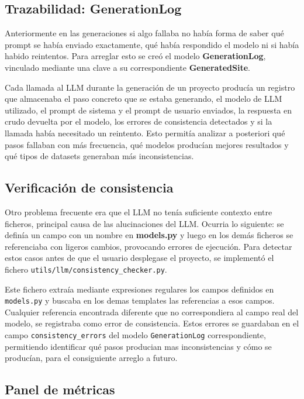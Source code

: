 \subsection{Trazabilidad: GenerationLog}
\label{subsec:trazabilidad-generationlog}

Anteriormente en las generaciones si algo fallaba no había forma de saber qué prompt se había enviado exactamente, qué había respondido el modelo ni si había habido reintentos. Para arreglar esto se creó el modelo \textbf{GenerationLog}, vinculado mediante una clave a su correspondiente \textbf{GeneratedSite}. 

Cada llamada al LLM durante la generación de un proyecto producía un registro que almacenaba el paso concreto que se estaba generando, el modelo de LLM utilizado, el prompt de sistema y el prompt de usuario enviados, la respuesta en crudo devuelta por el modelo, los errores de consistencia detectados y si la llamada había necesitado un reintento. Esto permitía analizar a posteriori qué pasos fallaban con más frecuencia, qué modelos producían mejores resultados y qué tipos de datasets generaban más inconsistencias.


\subsection{Verificación de consistencia}
\label{subsec:verificacion-consistencia}

Otro problema frecuente era que el LLM no tenía suficiente contexto entre ficheros, principal causa de las alucinaciones del LLM. Ocurria lo siguiente:
se definía un campo con un nombre en \textbf{models.py} y luego en los demás ficheros se referenciaba con ligeros cambios, provocando errores de ejecución.
Para detectar estos casos antes de que el usuario desplegase el proyecto, se implementó el fichero \texttt{utils/llm/consistency\_checker.py}.

Este fichero extraía mediante expresiones regulares los campos definidos en \texttt{models.py} y buscaba en los demas templates las referencias a esos campos. Cualquier referencia encontrada diferente que no correspondiera al campo real del modelo, se registraba como error de consistencia. 
Estos errores se guardaban en el campo \texttt{consistency\_errors} del modelo \texttt{GenerationLog} correspondiente, permitiendo identificar qué pasos producian mas inconsistencias y cómo se producían, para el consiguiente arreglo a futuro.


\subsection{Panel de métricas}
\label{subsec:panel-metricas}

